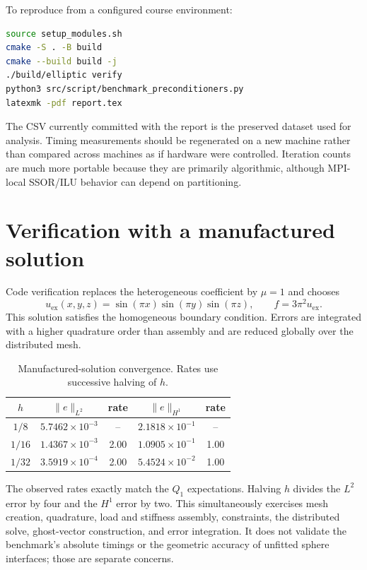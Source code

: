 \documentclass[10pt,a4paper]{article}
\begin{document}
To reproduce from a configured course environment:
\begin{lstlisting}[language=bash]
source setup_modules.sh
cmake -S . -B build
cmake --build build -j
./build/elliptic verify
python3 src/script/benchmark_preconditioners.py
latexmk -pdf report.tex
\end{lstlisting}

The CSV currently committed with the report is the preserved dataset used for analysis. Timing
measurements should be regenerated on a new machine rather than compared across machines as if
hardware were controlled. Iteration counts are much more portable because they are primarily
algorithmic, although MPI-local SSOR/ILU behavior can depend on partitioning.

\newpage
\section{Verification with a manufactured solution}
Code verification replaces the heterogeneous coefficient by $\mu=1$ and chooses
\begin{equation}
 u_{\mathrm{ex}}(x,y,z)=\sin(\pi x)\sin(\pi y)\sin(\pi z),\qquad
 f=3\pi^2u_{\mathrm{ex}}.
\end{equation}
This solution satisfies the homogeneous boundary condition. Errors are integrated with a higher
quadrature order than assembly and are reduced globally over the distributed mesh.

\begin{table}[h]
\centering
\caption{Manufactured-solution convergence. Rates use successive halving of $h$.}
\begin{tabular}{ccccc}
\toprule
$h$ & $\|e\|_{L^2}$ & rate & $\|e\|_{H^1}$ & rate\\
\midrule
$1/8$  & $5.7462\times10^{-3}$ & --   & $2.1818\times10^{-1}$ & --\\
$1/16$ & $1.4367\times10^{-3}$ & 2.00 & $1.0905\times10^{-1}$ & 1.00\\
$1/32$ & $3.5919\times10^{-4}$ & 2.00 & $5.4524\times10^{-2}$ & 1.00\\
\bottomrule
\end{tabular}
\label{tab:verification}
\end{table}

The observed rates exactly match the $Q_1$ expectations. Halving $h$ divides the $L^2$ error by
four and the $H^1$ error by two. This simultaneously exercises mesh creation, quadrature, load and
stiffness assembly, constraints, the distributed solve, ghost-vector construction, and error
integration. It does not validate the benchmark's absolute timings or the geometric accuracy of
unfitted sphere interfaces; those are separate concerns.
\end{document}
